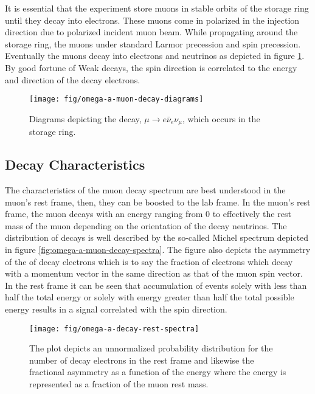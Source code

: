 It is essential that the experiment store muons in stable orbits of the storage ring until they decay into electrons.  These muons come in polarized in the injection direction due to polarized incident muon beam.  While propagating around the storage ring, the muons under standard Larmor precession and spin precession.  Eventually the muons decay into electrons and neutrinos as depicted in figure \ref{fig:omega-a-muon-decay-diagrams}.  By good fortune of Weak decays, the spin direction is correlated to the energy and direction of the decay electrons.

\begin{figure}
\label{fig:omega-a-muon-decay-diagrams}
\texttt{[image: fig/omega-a-muon-decay-diagrams]}
\caption{Diagrams depicting the decay, $\mu \rightarrow e \bar{\nu}_e \nu_\mu$, which occurs in the \gmtwo storage ring.}
\end{figure}

\subsection{Decay Characteristics}

The characteristics of the muon decay spectrum are best understood in the muon's rest frame, then, they can be boosted to the lab frame.  In the muon's rest frame, the muon decays with an energy ranging from 0 to effectively the rest mass of the muon depending on the orientation of the decay neutrinos.  The distribution of decays is well described by the so-called Michel spectrum depicted in figure \ref{fig:omega-a-muon-decay-spectra}.  The figure also depicts the asymmetry of the of decay electrons which is to say the fraction of electrons which decay with a momentum vector in the same direction as that of the muon spin vector.  In the rest frame it can be seen that accumulation of events solely with less than half the total energy or solely with energy greater than half the total possible energy results in a signal correlated with the spin direction. \cite{e821-prd}

\begin{figure}
\label{fig:omega-a-decay-rest-spectra}
\texttt{[image: fig/omega-a-decay-rest-spectra]}
\caption{The plot depicts an unnormalized probability distribution for the number of decay electrons in the rest frame and likewise the fractional asymmetry as a function of the energy where the energy is represented as a fraction of the muon rest mass.}
\end{figure}

